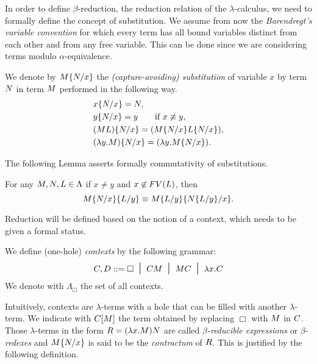 \begin{THESIS}
	In order to define $\beta$-reduction, the reduction relation of the $\lambda$-calculus, we need to formally define the concept of substitution. 
	We assume from now the \emph{Barendregt's variable convention} for which every term has all bound variables distinct from each other and from any free variable. This can be done since we are considering terms modulo $\alpha$-equivalence.
	\begin{definition}
		We denote by $M\{N/x\}$ the \emph{(capture-avoiding) substitution} of variable $x$ by term $N$ in term $M$ performed in the following way.
		\begin{align*}
		&x\{N/x\}=N,\\
		&y\{N/x\}=y\qquad\textrm{if $x\not\equiv y$},\\
		&(ML)\{N/x\}=(M\{N/x\}L\{N/x\}),\\
		&(\lambda y.M)\{N/x\}=(\lambda y.M\{N/x\}).
		\end{align*}
	\end{definition}
	The following Lemma asserts formally commutativity of substitutions.
	\begin{lemma}
		For any $M,N,L\in\Lambda$ if $x\neq y$ and $x\not\in FV(L)$, then
		$$
		M\{N/x\}\{L/y\}\equiv M\{L/y\}\{N\{L/y\}/x\}.
		$$
	\end{lemma}
\end{THESIS}
Reduction will be defined based on the notion of a context, which
needs to be given a formal status.
\begin{definition}
	We define (one-hole) \emph{contexts} by the following grammar:
	$$
	C,D::=\Box\; \; \mbox{\Large{$\mid$}}\;\;CM\; \; \mbox{\Large{$\mid$}}\;\;MC\; \; \mbox{\Large{$\mid$}}\;\;\lambda x.C
	$$
	We denote with $\Lambda_\Box$ the set of all contexts.
\end{definition}
Intuitively, contexts are $\lambda$-terms with a hole that can be
filled with another $\lambda$-term. We indicate with
$C[M]$ the term obtained by replacing $\Box$ with
$M$ in $C$. Those $\lambda$-terms in the form
$R=(\lambda x.M)N$ are called \emph{$\beta$-reducible expressions} or
$\beta$-\emph{redexes} and $M\{N/x\}$ is said to be
the \emph{contractum} of $R$. This is justified by the following definition.
